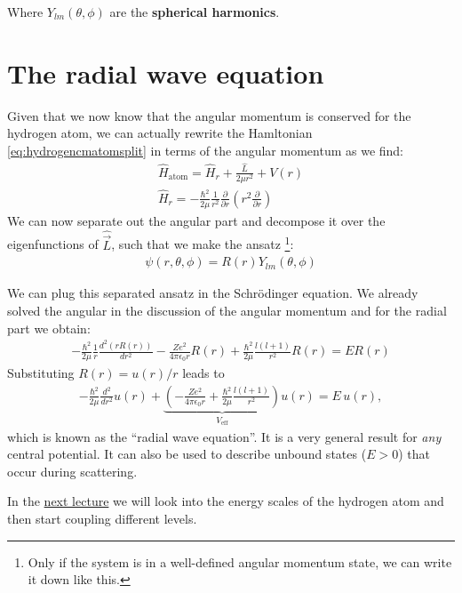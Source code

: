 \documentclass[10pt]{article}
\begin{document}
Where $Y_{lm}(\theta, \phi)$ are the \textbf{spherical harmonics}.

\section{The radial wave equation}

Given that we now know that the angular momentum is conserved for the hydrogen atom, we can actually rewrite the Hamltonian \ref{eq:hydrogencmatomsplit} in terms of the angular momentum as we find:
\begin{align}
\hat{H}_\text{atom} = \hat{H}_r + \frac{\hat{L}}{2\mu r^2}+V(r) \\
\hat{H}_r = -\frac{\hbar^2}{2\mu}\frac{1}{r^2}\frac{\partial}{\partial r}\left(r^2\frac{\partial}{\partial r}\right)
\end{align}
We can now separate out the angular part and decompose it over the eigenfunctions of $\hat{\vec{L}}$, such that we make the ansatz \footnote{ Only if the system is in a well-defined angular momentum state, we can write it down like this.}:
\begin{align}
\psi (r,\theta,\phi) = R(r) Y_{lm}(\theta,\phi)
\end{align}

We can plug this separated ansatz in the Schrödinger equation. We already solved the angular in the discussion of the angular momentum and for the radial part we obtain:
\begin{align}
-\frac{\hbar^2}{2\mu}\frac{1}{r}\frac{d^2(rR(r))}{dr^2} - \frac{Ze^2}{4\pi\epsilon_0 r} R(r) + \frac{\hbar^2}{2\mu}\frac{l(l+1)}{r^2}R(r) = ER(r)
\end{align}
%
Substituting $R(r)=u(r)/r$ leads to
\begin{align}
-\frac{\hbar^2}{2\mu}\frac{d^2}{dr^2}u(r) +\underbrace{ \left( -\frac{Ze^2}{4\pi\epsilon_0 r} + \frac{\hbar^2}{2\mu} \frac{l(l+1)}{r^2} \right)}_{V_{\text{eff}}} u(r) = E \, u(r),\end{align}
which is known as the ``radial wave equation''. It is a very general result for \emph{any} central potential. It can also be used to describe unbound states ($E>0$) that occur during scattering.

In the \href{https://www.authorea.com/users/143341/articles/326674-lecture-6-the-dipole-approximation-in-the-hydrogen-atom}{next lecture} we will look into the energy scales of the hydrogen atom and then start coupling different levels.

\FloatBarrier
\nocite{*}



\end{document}

